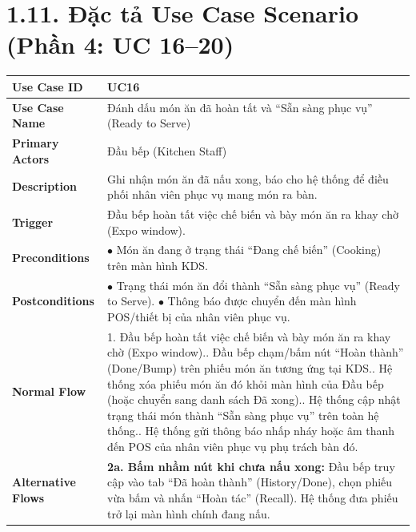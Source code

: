 \section*{1.11. Đặc tả Use Case Scenario (Phần 4: UC 16--20)}

\begin{longtable}{|L{3.5cm}|L{12.5cm}|}
\hline
\textbf{Use Case ID} & UC16 \\ \hline
\textbf{Use Case Name} & Đánh dấu món ăn đã hoàn tất và ``Sẵn sàng phục vụ'' (Ready to Serve) \\ \hline
\textbf{Primary Actors} & Đầu bếp (Kitchen Staff) \\ \hline
\textbf{Description} & Ghi nhận món ăn đã nấu xong, báo cho hệ thống để điều phối nhân viên phục vụ mang món ra bàn. \\ \hline
\textbf{Trigger} & Đầu bếp hoàn tất việc chế biến và bày món ăn ra khay chờ (Expo window). \\ \hline
\textbf{Preconditions} & $\bullet$ Món ăn đang ở trạng thái ``Đang chế biến'' (Cooking) trên màn hình KDS. \\ \hline
\textbf{Postconditions} &
$\bullet$ Trạng thái món ăn đổi thành ``Sẵn sàng phục vụ'' (Ready to Serve).\newline
$\bullet$ Thông báo được chuyển đến màn hình POS/thiết bị của nhân viên phục vụ. \\ \hline
\textbf{Normal Flow} &
1. Đầu bếp hoàn tất việc chế biến và bày món ăn ra khay chờ (Expo window).. Đầu bếp chạm/bấm nút ``Hoàn thành'' (Done/Bump) trên phiếu món ăn tương ứng tại KDS.. Hệ thống xóa phiếu món ăn đó khỏi màn hình của Đầu bếp (hoặc chuyển sang danh sách Đã xong).. Hệ thống cập nhật trạng thái món thành ``Sẵn sàng phục vụ'' trên toàn hệ thống.. Hệ thống gửi thông báo nhấp nháy hoặc âm thanh đến POS của nhân viên phục vụ phụ trách bàn đó. \\ \hline
\textbf{Alternative Flows} &
\textbf{2a. Bấm nhầm nút khi chưa nấu xong:} Đầu bếp truy cập vào tab ``Đã hoàn thành'' (History/Done), chọn phiếu vừa bấm và nhấn ``Hoàn tác'' (Recall). Hệ thống đưa phiếu trở lại màn hình chính đang nấu. \\ \hline
\end{longtable}

